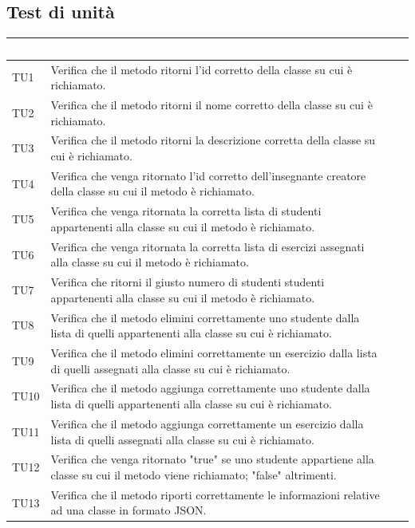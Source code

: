 \subsection{Test di unità}
\begin{longtable}{|>{\centering\arraybackslash}m{1.6cm}|>{\centering\arraybackslash}m{6.41cm}|>{\centering\arraybackslash}m{3.1cm}| c |}		
		\rowcolor{LightBlue}
		\textbf{\textcolor{white}{Test}}
		& \multicolumn{1}{|c|}{\textbf{\textcolor{white}{ Descrizione}}}\\
		\hline
		TU1 & Verifica che il metodo ritorni l'id corretto della classe su cui è richiamato. \\ \hline
		TU2 & Verifica che il metodo ritorni il nome corretto della classe su cui è richiamato. \\ \hline
		TU3 & Verifica che il metodo ritorni la descrizione corretta della classe su cui è richiamato.\\ \hline
		TU4 & Verifica che venga ritornato l'id corretto dell'insegnante creatore della classe su cui il metodo è richiamato. \\ \hline
		TU5 & Verifica che venga ritornata la corretta lista di studenti appartenenti alla classe su cui il metodo è richiamato.  \\ \hline
		TU6 & Verifica che venga ritornata la corretta lista di esercizi assegnati alla classe su cui il metodo è richiamato.\\ \hline
		TU7 & Verifica che ritorni il giusto numero di studenti studenti appartenenti alla classe su cui il metodo è richiamato.  \\ \hline
		TU8 & Verifica che il metodo elimini correttamente uno studente dalla lista di quelli appartenenti alla classe su cui è  richiamato.  \\ \hline
		TU9 & Verifica che il metodo elimini correttamente un esercizio dalla lista di quelli assegnati alla classe su cui è  richiamato.\\ \hline
		TU10 & Verifica che il metodo aggiunga correttamente uno studente dalla lista di quelli appartenenti alla classe su cui è  richiamato.\\ \hline
		TU11 & Verifica che il metodo aggiunga correttamente un esercizio dalla lista di quelli assegnati alla classe su cui è  richiamato. \\ \hline
		TU12 & Verifica che venga ritornato "true" se uno studente appartiene alla classe su cui il metodo viene richiamato; "false" altrimenti.  \\ \hline	
		TU13 & Verifica che il metodo riporti correttamente le informazioni relative ad una classe in formato JSON. \\ \hline	
		

\end{longtable}
